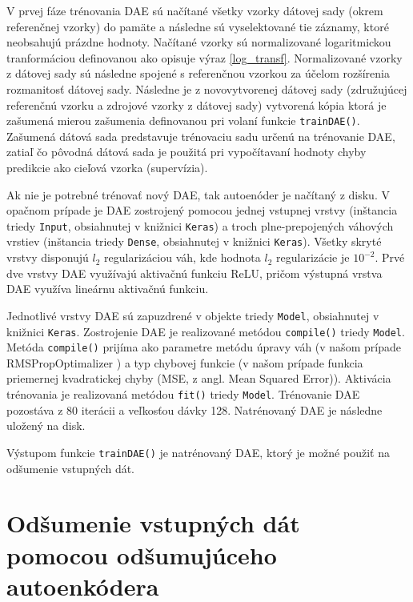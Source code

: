 V prvej fáze trénovania DAE sú načítané všetky vzorky dátovej sady (okrem referenčnej vzorky) do pamäte a následne sú vyselektované tie záznamy, ktoré neobsahujú prázdne hodnoty. Načítané vzorky sú normalizované logaritmickou tranformáciou definovanou ako opisuje výraz \ref{log_transf}. Normalizované vzorky z dátovej sady sú následne spojené s referenčnou vzorkou za účelom rozšírenia rozmanitosť dátovej sady.  Následne je z novovytvorenej dátovej sady (združujúcej referenčnú vzorku a zdrojové vzorky z dátovej sady) vytvorená kópia ktorá je zašumená mierou zašumenia definovanou pri volaní funkcie \texttt{trainDAE()}. Zašumená dátová sada predstavuje trénovaciu sadu určenú na trénovanie DAE, zatiaľ čo pôvodná dátová sada je použitá pri vypočítavaní hodnoty chyby predikcie ako cieľová vzorka (supervízia).

Ak nie je potrebné trénovať nový DAE, tak autoenóder je načítaný z disku. V opačnom prípade je DAE zostrojený pomocou jednej vstupnej vrstvy (inštancia triedy \texttt{Input}, obsiahnutej v knižnici \texttt{Keras}) a troch plne-prepojených váhových vrstiev (inštancia triedy \texttt{Dense}, obsiahnutej v knižnici \texttt{Keras}). Všetky skryté vrstvy disponujú $l_2$ regularizáciou váh, kde hodnota $l_2$ regularizácie je $10^{-2}$. Prvé dve vrstvy DAE využívajú aktivačnú funkciu ReLU, pričom výstupná vrstva DAE využíva lineárnu aktivačnú funkciu.

Jednotlivé vrstvy DAE sú zapuzdrené v objekte triedy \texttt{Model}, obsiahnutej v knižnici \texttt{Keras}. Zostrojenie DAE je realizované metódou \texttt{compile()} triedy \texttt{Model}. Metóda \texttt{compile()} prijíma ako parametre metódu úpravy váh (v našom prípade RMSPropOptimalizer \cite{Goh1995}) a typ chybovej funkcie (v našom prípade funkcia priemernej kvadratickej chyby (MSE, z angl. Mean Squared Error)). Aktivácia trénovania je realizovaná metódou \texttt{fit()} triedy \texttt{Model}. Trénovanie DAE pozostáva z 80 iterácii a veľkosťou dávky 128. Natrénovaný DAE je následne uložený na disk.

Výstupom funkcie \texttt{trainDAE()} je natrénovaný DAE, ktorý je možné použiť na odšumenie vstupných dát.

\section{Odšumenie vstupných dát pomocou odšumujúceho autoenkódera}
\label{predict_DAE}

